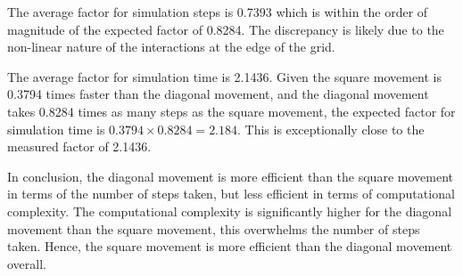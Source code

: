 The average factor for simulation steps is 0.7393 which is within the order of magnitude of the expected factor of 0.8284.
The discrepancy is likely due to the non-linear nature of the interactions at the edge of the grid.

The average factor for simulation time is 2.1436.
Given the square movement is 0.3794 times faster than the diagonal movement,
and the diagonal movement takes 0.8284 times as many steps as the square movement,
the expected factor for simulation time is $0.3794 \times 0.8284 = 2.184$.
This is exceptionally close to the measured factor of 2.1436.


In conclusion, the diagonal movement is more efficient than the square movement in terms of the number of steps taken, but less efficient in terms of computational complexity.
The computational complexity is significantly higher for the diagonal movement than the square movement, this overwhelms the number of steps taken.
Hence, the square movement is more efficient than the diagonal movement overall.

\clearpage